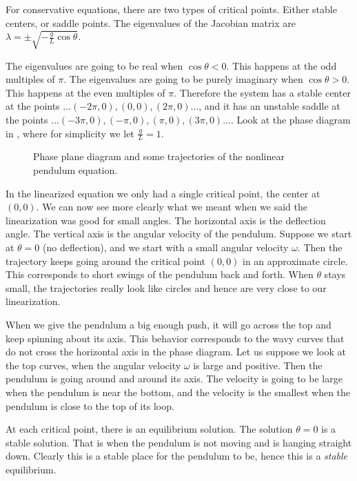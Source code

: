 \documentclass[12pt]{book}
\begin{document}
For conservative equations, there are two types of
critical points.  Either stable centers, or saddle points.  The eigenvalues
of the Jacobian matrix are $\lambda = \pm \sqrt{-\frac{g}{L}\cos \theta}$.

The
eigenvalues are going to be real when $\cos \theta < 0$.  This happens at the odd multiples of $\pi$.
The
eigenvalues are going to be purely imaginary 
when $\cos \theta > 0$.  This happens at the even
multiples of $\pi$.  Therefore the system has a stable center at
the points $\ldots (-2\pi,0), (0,0), (2\pi,0) \ldots$, and it has an
unstable saddle at
the points $\ldots (-3\pi,0), (-\pi,0), (\pi,0), (3\pi,0) \ldots$.  Look at the
phase diagram in ,
where for simplicity we let $\frac{g}{L} = 1$.

\begin{figure}[h!t]
\capstart
\begin{center}
\caption{Phase plane diagram and some trajectories of
the nonlinear pendulum equation. \label{fig:nlin-pend-phasediag}}
\end{center}
\end{figure}

In the linearized equation we only had a single critical point, the center
at $(0,0)$.  We can now see more clearly what we meant when we said the
linearization was good for small angles.  The horizontal axis is the
deflection angle.  The vertical axis is the angular velocity of the
pendulum.  Suppose we start at $\theta = 0$ (no deflection), and
we start with a small angular velocity $\omega$.  Then the trajectory keeps going
around the critical point $(0,0)$ in an approximate circle.  This
corresponds to short swings of the pendulum back and forth.  When $\theta$
stays small, the trajectories really look like circles and hence are very
close to our linearization.

When we give the pendulum a big enough push, it will
go across the top and keep spinning about its axis.  This behavior
corresponds to the
wavy curves that do not cross the horizontal axis in the phase diagram.
Let us suppose we look at the top curves, when the angular velocity $\omega$
is large and positive.  Then the pendulum is going
around and around its axis.  The velocity is going to
be large when the pendulum is near the bottom, and the velocity is the
smallest when the pendulum
is close to the top of its loop.

At each critical point, there is an equilibrium solution.  The solution
$\theta = 0$ is a stable solution.  That is when the pendulum is not moving
and is hanging straight down.  Clearly this is a stable place for the
pendulum to be, hence this is a \emph{stable} equilibrium.
\end{document}

